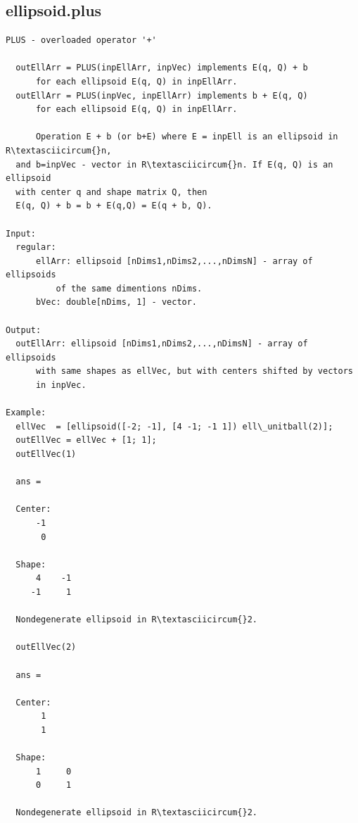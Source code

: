 \documentclass[letterpaper,10pt,english]{sphinxmanual}
\begin{document}
\subsection{ellipsoid.plus}
\label{chap_functions:ellipsoid-plus}
\begin{Verbatim}[commandchars=\\\{\}]
PLUS - overloaded operator '+'

  outEllArr = PLUS(inpEllArr, inpVec) implements E(q, Q) + b
      for each ellipsoid E(q, Q) in inpEllArr.
  outEllArr = PLUS(inpVec, inpEllArr) implements b + E(q, Q)
      for each ellipsoid E(q, Q) in inpEllArr.

      Operation E + b (or b+E) where E = inpEll is an ellipsoid in R\textasciicircum{}n,
  and b=inpVec - vector in R\textasciicircum{}n. If E(q, Q) is an ellipsoid
  with center q and shape matrix Q, then
  E(q, Q) + b = b + E(q,Q) = E(q + b, Q).

Input:
  regular:
      ellArr: ellipsoid [nDims1,nDims2,...,nDimsN] - array of ellipsoids
          of the same dimentions nDims.
      bVec: double[nDims, 1] - vector.

Output:
  outEllArr: ellipsoid [nDims1,nDims2,...,nDimsN] - array of ellipsoids
      with same shapes as ellVec, but with centers shifted by vectors
      in inpVec.

Example:
  ellVec  = [ellipsoid([-2; -1], [4 -1; -1 1]) ell\_unitball(2)];
  outEllVec = ellVec + [1; 1];
  outEllVec(1)

  ans =

  Center:
      -1
       0

  Shape:
      4    -1
     -1     1

  Nondegenerate ellipsoid in R\textasciicircum{}2.

  outEllVec(2)

  ans =

  Center:
       1
       1

  Shape:
      1     0
      0     1

  Nondegenerate ellipsoid in R\textasciicircum{}2.
\end{Verbatim}
\end{document}
